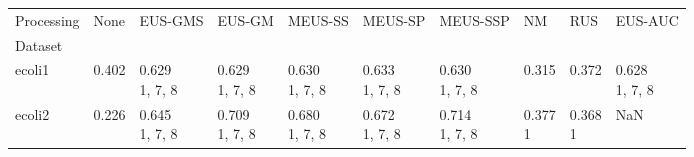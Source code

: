 \begin{tabular}{llllllllll}
\toprule
Processing &                                                     None &                                   EUS-GMS &                                          EUS-GM &                                            MEUS-SS &                                         MEUS-SP &                                              MEUS-SSP &                                        NM &                                    RUS &                                   EUS-AUC \\
Dataset                &                                                          &                                           &                                                 &                                                    &                                                 &                                                       &                                           &                                        &                                           \\
\midrule
ecoli1                 &                        \makecell{0.402 \\ \scriptsize{}} &  \makecell{0.629 \\ \scriptsize{1, 7, 8}} &        \makecell{0.629 \\ \scriptsize{1, 7, 8}} &           \makecell{0.630 \\ \scriptsize{1, 7, 8}} &        \makecell{0.633 \\ \scriptsize{1, 7, 8}} &              \makecell{0.630 \\ \scriptsize{1, 7, 8}} &         \makecell{0.315 \\ \scriptsize{}} &      \makecell{0.372 \\ \scriptsize{}} &  \makecell{0.628 \\ \scriptsize{1, 7, 8}} \\
ecoli2                 &                        \makecell{0.226 \\ \scriptsize{}} &  \makecell{0.645 \\ \scriptsize{1, 7, 8}} &        \makecell{0.709 \\ \scriptsize{1, 7, 8}} &           \makecell{0.680 \\ \scriptsize{1, 7, 8}} &        \makecell{0.672 \\ \scriptsize{1, 7, 8}} &              \makecell{0.714 \\ \scriptsize{1, 7, 8}} &        \makecell{0.377 \\ \scriptsize{1}} &     \makecell{0.368 \\ \scriptsize{1}} &                                       NaN \\

\end{tabular}
